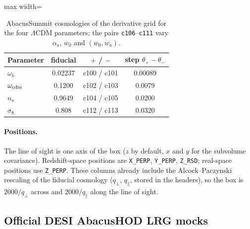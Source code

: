 \begin{table}[!htbp]
\centering\small
\begin{adjustbox}{max width=\linewidth}
\begin{tabular}{lccc}
\toprule
Parameter & fiducial & $+$ / $-$ & step $\theta_+-\theta_-$ \\
\midrule
$\omega_b$ & 0.02237 & c100 / c101 & 0.00089 \\
$\omega_{\rm cdm}$ & 0.1200 & c102 / c103 & 0.0079 \\
$n_s$ & 0.9649 & c104 / c105 & 0.0200 \\
$\sigma_8$ & 0.808 & c112 / c113 & 0.0320 \\
\bottomrule
\end{tabular}
\end{adjustbox}
\caption{AbacusSummit cosmologies of the derivative grid for the four $\Lambda$CDM parameters; the pairs \texttt{c106}--\texttt{c111} vary $\alpha_s$, $w_0$ and $(w_0, w_a)$.}
\label{tab:cosmo}
\end{table}

\paragraph{Positions.} The line of sight is one axis of the box ($z$ by default, $x$ and $y$ for the subvolume covariance). Redshift-space positions are \texttt{X\_PERP}, \texttt{Y\_PERP}, \texttt{Z\_RSD}; real-space positions use \texttt{Z\_PERP}. These columns already include the Alcock--Paczynski rescaling of the fiducial cosmology ($q_\perp$, $q_\parallel$, stored in the headers), so the box is $2000/q_\perp$ across and $2000/q_\parallel$ along the line of sight.

\subsection{Official DESI AbacusHOD LRG mocks}
\label{sec:official}

